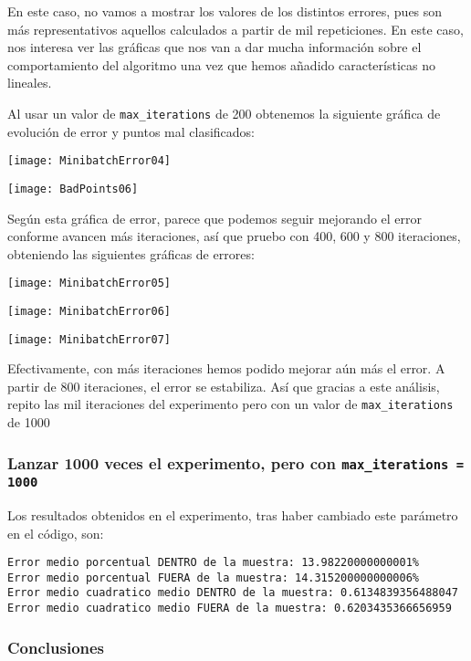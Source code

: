 \documentclass[11pt]{article}
\begin{document}
En este caso, no vamos a mostrar los valores de los distintos errores, pues son más representativos aquellos calculados a partir de mil repeticiones. En este caso, nos interesa ver las gráficas que nos van a dar mucha información sobre el comportamiento del algoritmo una vez que hemos añadido características no lineales.

Al usar un valor de \lstinline{max_iterations} de 200 obtenemos la siguiente gráfica de evolución de error y puntos mal clasificados:

\texttt{[image: MinibatchError04]}

\texttt{[image: BadPoints06]}

Según esta gráfica de error, parece que podemos seguir mejorando el error conforme avancen más iteraciones, así que pruebo con 400, 600 y 800 iteraciones, obteniendo las siguientes gráficas de errores:


\texttt{[image: MinibatchError05]}

\texttt{[image: MinibatchError06]}

\texttt{[image: MinibatchError07]}

Efectivamente, con más iteraciones hemos podido mejorar aún más el error. A partir de 800 iteraciones, el error se estabiliza. Así que gracias a este análisis, repito las mil iteraciones del experimento pero con un valor de \lstinline{max_iterations} de 1000

\subsubsection{Lanzar 1000 veces el experimento, pero con \lstinline{max_iterations = 1000}}

Los resultados obtenidos en el experimento, tras haber cambiado este parámetro en el código, son:

\begin{lstlisting}
Error medio porcentual DENTRO de la muestra: 13.98220000000001%
Error medio porcentual FUERA de la muestra: 14.315200000000006%
Error medio cuadratico medio DENTRO de la muestra: 0.6134839356488047
Error medio cuadratico medio FUERA de la muestra: 0.6203435366656959
\end{lstlisting}

\subsubsection{Conclusiones}
\end{document}
